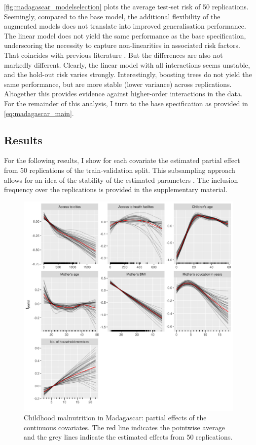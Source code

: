 \autoref{fig:madagascar_modelselection} plots the average test-set risk of 50 replications. Seemingly, compared to the base model, the additional flexibility of the augmented models does not translate into improved generalisation performance. The linear model does not yield the same performance as the base specification, underscoring the necessity to capture non-linearities in associated risk factors. That coincides with previous literature \autocite{fenskeIdentifyingRiskFactors2011, kandalaGeoadditiveModelsChildhood2009}. But the differences are also not markedly different. Clearly, the linear model with all interactions seems unstable, and the hold-out risk varies strongly. Interestingly, boosting trees do not yield the same performance, but are more stable (lower variance) across replications. Altogether this provides evidence against higher-order interactions in the data. For the remainder of this analysis, I turn to the base specification as provided in \autoref{eq:madagascar_main}.


\subsection{Results}

For the following results, I show for each covariate the estimated partial effect from 50 replications of the train-validation split. This subsampling approach allows for an idea of the stability of the estimated parameters \autocite{meinshausenStabilitySelectionStability2010}. The inclusion frequency over the replications is provided in the supplementary material.

\begin{figure}[t!]
	\centering
	\includegraphics[width=\textwidth, keepaspectratio]{figures/madagascar_smootheffects.png}
	\caption{Childhood malnutrition in Madagascar: partial effects of the continuous covariates. The red line indicates the pointwise average and the grey lines indicate the estimated effects from 50 replications.}
	\label{fig:madagascar_smootheffects}
\end{figure}


